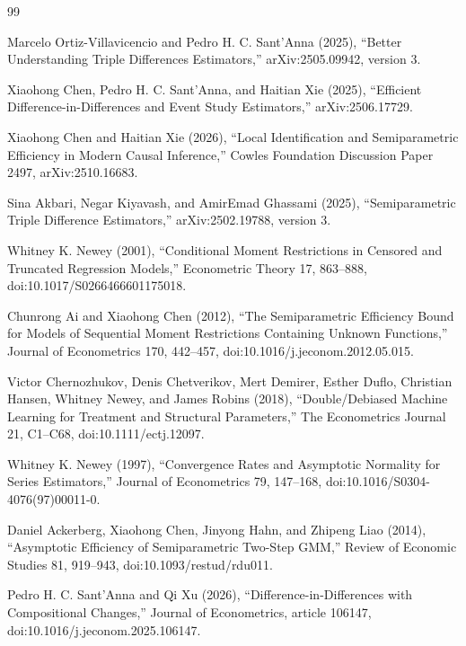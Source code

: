 \documentclass{article}
\begin{document}
\begin{thebibliography}{99}

   Marcelo Ortiz-Villavicencio and Pedro H. C. Sant'Anna (2025), ``Better Understanding Triple Differences Estimators,'' arXiv:2505.09942, version 3.

   Xiaohong Chen, Pedro H. C. Sant'Anna, and Haitian Xie (2025), ``Efficient Difference-in-Differences and Event Study Estimators,'' arXiv:2506.17729.

   Xiaohong Chen and Haitian Xie (2026), ``Local Identification and Semiparametric Efficiency in Modern Causal Inference,'' Cowles Foundation Discussion Paper 2497, arXiv:2510.16683.

   Sina Akbari, Negar Kiyavash, and AmirEmad Ghassami (2025), ``Semiparametric Triple Difference Estimators,'' arXiv:2502.19788, version 3.

   Whitney K. Newey (2001), ``Conditional Moment Restrictions in Censored and Truncated Regression Models,'' Econometric Theory 17, 863--888, doi:10.1017/S0266466601175018.

   Chunrong Ai and Xiaohong Chen (2012), ``The Semiparametric Efficiency Bound for Models of Sequential Moment Restrictions Containing Unknown Functions,'' Journal of Econometrics 170, 442--457, doi:10.1016/j.jeconom.2012.05.015.

   Victor Chernozhukov, Denis Chetverikov, Mert Demirer, Esther Duflo, Christian Hansen, Whitney Newey, and James Robins (2018), ``Double/Debiased Machine Learning for Treatment and Structural Parameters,'' The Econometrics Journal 21, C1--C68, doi:10.1111/ectj.12097.

   Whitney K. Newey (1997), ``Convergence Rates and Asymptotic Normality for Series Estimators,'' Journal of Econometrics 79, 147--168, doi:10.1016/S0304-4076(97)00011-0.

   Daniel Ackerberg, Xiaohong Chen, Jinyong Hahn, and Zhipeng Liao (2014), ``Asymptotic Efficiency of Semiparametric Two-Step GMM,'' Review of Economic Studies 81, 919--943, doi:10.1093/restud/rdu011.

   Pedro H. C. Sant'Anna and Qi Xu (2026), ``Difference-in-Differences with Compositional Changes,'' Journal of Econometrics, article 106147, doi:10.1016/j.jeconom.2025.106147.


\end{thebibliography}
\end{document}
